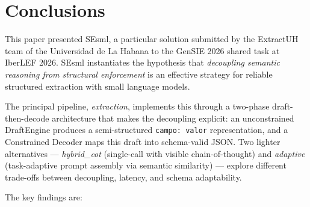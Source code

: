 \documentclass{ceurart}
\begin{document}
\section{Conclusions}
\label{sec:conclusions}

This paper presented SEsml, a particular solution submitted by the ExtractUH team of
the Universidad de La Habana to the GenSIE 2026 shared task at IberLEF 2026.
SEsml instantiates the hypothesis that \emph{decoupling semantic reasoning from
structural enforcement} is an effective strategy for reliable structured extraction
with small language models.

The principal pipeline, \emph{extraction}, implements this through a two-phase
draft-then-decode architecture that makes the decoupling explicit: an unconstrained
DraftEngine produces a semi-structured \texttt{campo: valor} representation, and a
Constrained Decoder maps this draft into schema-valid JSON.
Two lighter alternatives --- \emph{hybrid\_cot} (single-call with visible
chain-of-thought) and \emph{adaptive} (task-adaptive prompt assembly via semantic
similarity) --- explore different trade-offs between decoupling, latency, and schema
adaptability.

The key findings are:
\end{document}

